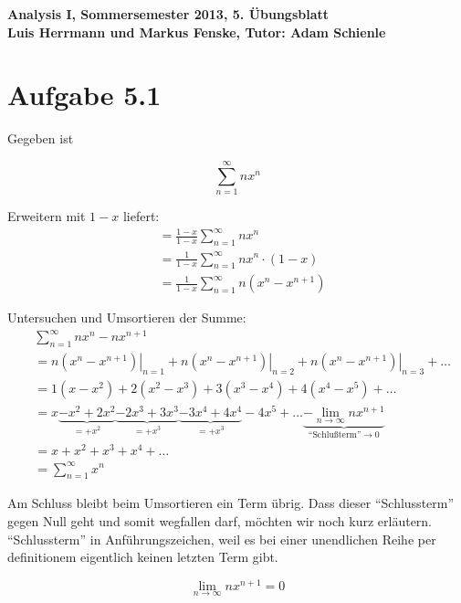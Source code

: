 \documentclass[a4paper,german,12pt,smallheadings]{scrartcl}
\begin{document}
\begin{center}
\bfseries %
\sffamily %
\vspace{-40pt}
Analysis I, Sommersemester 2013, 5. Übungsblatt \\
Luis Herrmann und Markus Fenske, Tutor: Adam Schienle
\vspace{-10pt}
\end{center}

\section*{Aufgabe 5.1}
Gegeben ist

\begin{equation*}
\sum_{n=1}^\infty nx^n 
\end{equation*}

Erweitern mit $1-x$ liefert:
\begin{align*}
  &=\frac{1-x}{1-x} \sum\limits_{n=1}^{\infty} nx^n \\
  &=\frac{1}{1-x} \sum\limits_{n=1}^{\infty} nx^n\cdot(1-x) \\
  &=\frac{1}{1-x} \sum_{n=1}^\infty n(x^n - x^{n+1})
\end{align*}

Untersuchen und Umsortieren der Summe:
\begin{align*}
  &\sum_{n=1}^\infty nx^n - nx^{n+1} \\
  &= \left. n(x^n - x^{n+1}) \right|_{n=1} + \left. n(x^n - x^{n+1}) \right|_{n=2} + \left. n(x^n - x^{n+1}) \right|_{n=3} + \dots \\
  &= 1(x - x^2) + 2(x^2 - x^3) + 3(x^3 - x^4) + 4(x^4 - x^5) + \dots \\
  &= x \underbrace{- x^2 + 2x^2}_{=+x^2} \underbrace{- 2x^3 + 3x^3}_{=+x^3} \underbrace{- 3x^4 + 4x^4}_{=+x^3} - 4x^5 + \dots \underbrace{- \lim\limits_{n \to \infty} nx^{n+1}}_{\text{``Schlußterm''} \to 0}\\
  &= x + x^2 + x^3 + x^4 + \dots \\
  &= \sum_{n=1}^\infty x^n
\end{align*}

Am Schluss bleibt beim Umsortieren ein Term übrig. Dass dieser ``Schlussterm''
gegen Null geht und somit wegfallen darf, möchten wir noch kurz erläutern.
``Schlussterm'' in Anführungszeichen, weil es bei einer unendlichen Reihe per
definitionem eigentlich keinen letzten Term gibt.

\begin{equation*}
  \lim\limits_{n \to \infty} nx^{n+1}=0
\end{equation*}
\end{document}
